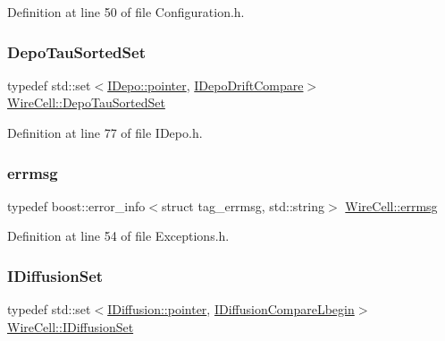 Definition at line 50 of file Configuration.\+h.

\mbox{\label{namespace_wire_cell_ac01bef08345e4a479b147822eef2a405}} 
\subsubsection{\texorpdfstring{Depo\+Tau\+Sorted\+Set}{DepoTauSortedSet}}
{\footnotesize\ttfamily typedef std\+::set$<$\hyperlink{class_wire_cell_1_1_i_data_aff870b3ae8333cf9265941eef62498bc}{I\+Depo\+::pointer}, \hyperlink{struct_wire_cell_1_1_i_depo_drift_compare}{I\+Depo\+Drift\+Compare}$>$ \hyperlink{namespace_wire_cell_ac01bef08345e4a479b147822eef2a405}{Wire\+Cell\+::\+Depo\+Tau\+Sorted\+Set}}



Definition at line 77 of file I\+Depo.\+h.

\mbox{\label{namespace_wire_cell_ae6c20ffaec96b23b9655898e20a673f1}} 
\subsubsection{\texorpdfstring{errmsg}{errmsg}}
{\footnotesize\ttfamily typedef boost\+::error\+\_\+info$<$struct tag\+\_\+errmsg, std\+::string$>$ \hyperlink{namespace_wire_cell_ae6c20ffaec96b23b9655898e20a673f1}{Wire\+Cell\+::errmsg}}



Definition at line 54 of file Exceptions.\+h.

\mbox{\label{namespace_wire_cell_ae8daa36d6182a834671ea359601da4a9}} 
\subsubsection{\texorpdfstring{I\+Diffusion\+Set}{IDiffusionSet}}
{\footnotesize\ttfamily typedef std\+::set$<$\hyperlink{class_wire_cell_1_1_i_data_aff870b3ae8333cf9265941eef62498bc}{I\+Diffusion\+::pointer}, \hyperlink{struct_wire_cell_1_1_i_diffusion_compare_lbegin}{I\+Diffusion\+Compare\+Lbegin}$>$ \hyperlink{namespace_wire_cell_ae8daa36d6182a834671ea359601da4a9}{Wire\+Cell\+::\+I\+Diffusion\+Set}}



